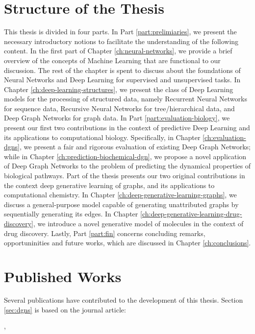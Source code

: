 \section{Structure of the Thesis}
This thesis is divided in four parts. In Part \ref{part:prelimiaries}, we present the necessary introductory notions to facilitate the understanding of the following content. In the first part of Chapter \ref{ch:neural-networks}, we provide a brief overview of the concepts of Machine Learning that are functional to our discussion. The rest of the chapter is spent to discuss about the foundations of Neural Networks and Deep Learning for supervised and unsupervised tasks. In Chapter \ref{ch:deep-learning-structures}, we present the class of Deep Learning models for the processing of structured data, namely Recurrent Neural Networks for sequence data, Recursive Neural Networks for tree/hierarchical data, and Deep Graph Networks for graph data. In Part \ref{part:evaluation-biology}, we present our first two contributions in the context of predictive Deep Learning and its applications to computational biology. Specifically, in Chapter \ref{ch:evaluation-dgns}, we present a fair and rigorous evaluation of existing Deep Graph Networks; while in Chapter \ref{ch:prediction-biochemical-dgn}, we propose a novel application of Deep Graph Networks to the problem of predicting the dynamical properties of biological pathways. Part \label{part:generative} of the thesis presents our two original contributions in the context deep generative learning of graphs, and its applications to computational chemistry. In Chapter \ref{ch:deep-generative-learning-graphs}, we discuss a general-purpose  model capable of generating unattributed graphs by sequentially generating its edges. In Chapter \ref{ch:deep-generative-learning-drug-discovery}, we introduce a novel generative model of molecules in the context of drug discovery. Lastly, Part \ref{part:fin} concerns concluding remarks, opportuninities and future works, which are discussed in Chapter \ref{ch:conclusions}.

\section{Published Works}
Several publications have contributed to the development of this thesis. Section \ref{sec:dgns} is based on the journal article:

\vspace{1em}
,
\vspace{1em}

